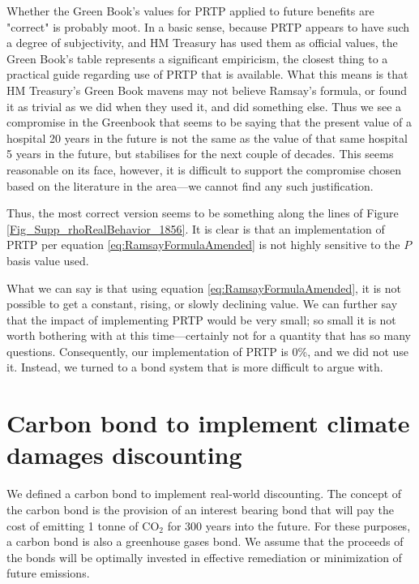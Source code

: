 \documentclass{article}
\begin{document}
Whether the Green Book's values for PRTP applied to future benefits are "correct" is probably moot. In a basic sense, because PRTP appears to have such a degree of subjectivity, and HM Treasury has used them as official values, the Green Book's table represents a significant empiricism, the closest thing to a practical guide regarding use of PRTP that is available. What this means is that HM Treasury's Green Book mavens may not believe Ramsay's formula, or found it as trivial as we did when they used it, and did something else. Thus we see a compromise in the Greenbook that seems to be saying that the  present value of a hospital 20 years in the future is not the same as the value of that same hospital 5 years in the future, but stabilises for the next couple of decades. This seems reasonable on its face, however, it is difficult to support the compromise chosen based on the literature in the area---we cannot find any such justification.  

Thus, the most correct version seems to be something along the lines of Figure \ref{Fig_Supp_rhoRealBehavior_1856}. It is clear is that an implementation of PRTP per equation \ref{eq:RamsayFormulaAmended} is not highly sensitive to the $P$ basis value used. 

What we can say is that using equation \ref{eq:RamsayFormulaAmended}, it is not possible to get a constant, rising, or slowly declining value. We can further say that the impact of implementing PRTP would be very small; so small it is not worth bothering with at this time---certainly not for a quantity that has so many questions. Consequently, our implementation of PRTP is 0\%, and we did not use it. Instead, we turned to a bond system that is more difficult to argue with. 

\section{Carbon bond to implement climate damages discounting} 
\label{Sect:Carbon_Bond}
We defined a carbon bond to implement real-world discounting.  The concept of the carbon bond is the provision of an interest bearing bond that will pay the cost of emitting 1 tonne of CO$_2$ for 300 years into the future. For these purposes, a carbon bond is also a greenhouse gases bond. We assume that the proceeds of the bonds will be optimally invested in effective remediation or minimization of future emissions.
\end{document}
